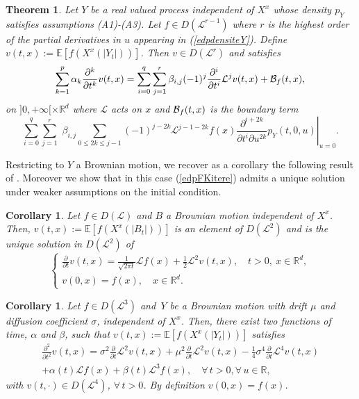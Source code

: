 \documentclass[a4paper, 11pt]{article}
\newtheorem{corol}[prop]{Corollary}
\newtheorem{thm}{Theorem}%
\newcommand{\R}{\mathbb{R}}
\newcommand{\E}{\mathbb{E}}
\newcommand{\1}{\mathbf{1}}
\begin{document}
\begin{thm}
\label{FKitere}
Let $Y$ be a real valued process independent of $X^x$ whose density $p_Y$ satisfies assumptions {\rm (A1)}-{\rm (A3)}. Let $f\in D(\mathcal{L}^{r-1})$ where $r$ is the highest order of the partial derivatives in $u$ appearing in (\ref{edpdensiteY}).  Define $v(t,x):=\E \left[f(X^x(|Y_t|))\right]$. Then $v\in D(\mathcal{L}^{r})$ and satisfies
\begin{equation}
\label{edpFKitere}
\sum_{k=1}^{p} \alpha_k \frac{\partial^k}{\partial t^k}v(t,x)=\sum_{i=0}^{q}\sum_{j=1}^{r}\beta_{i,j}(-1)^j\frac{\partial^i}{\partial t^i}\mathcal{L}^jv(t,x)+{\cal B}_f(t,x),
\end{equation}
on $]0,+\infty[\times \R^d$ where $\mathcal{L}$ acts on $x$ and  ${\cal B}_f(t,x)$ is the boundary term
\begin{equation}
\sum_{i=0}^{q}\sum_{j=1}^{r}\, \, \beta_{i,j}\sum_{0\leq 2k\leq j-1} (-1)^{j-2k}\mathcal{L}^{j-1-2k}f(x)\left. \frac{\partial^{i+2k}}{\partial t^i \partial u^{2k}}p_Y(t,0,u)\right|_{u=0}.
\end{equation}
\end{thm}


\bigskip


\noindent Restricting to $Y$ a Brownian motion, we recover as a corollary the following result of \cite{allouba}. Moreover we show that in this case (\ref{edpFKitere}) admits a unique solution under weaker assumptions on the initial condition.
\begin{corol}\label{corol:2}
Let $f\in D(\mathcal{L})$ and $B$ a Brownian motion independent of $X^x$. Then, $v(t,x):=\E \left[f(X^x(|B_t|))\right]$ is an element of $D(\mathcal{L}^2)$ and is the unique solution in $D(\mathcal{L}^2)$ of
\begin{equation}
\begin{cases} 
\label{FKibm}
\frac{\partial}{\partial t}v(t,x)=\frac{1}{\sqrt{2\pi t}}\mathcal{L}f(x)+\frac{1}{2}\mathcal{L}^2v(t,x), \quad t>0,\ x\in\R^d,\\
v(0,x)=f(x), \quad x\in\R^d.
\end{cases}
\end{equation}

\end{corol}
\begin{corol}
Let $f\in D(\mathcal{L}^3)$ and $\, Y$ be a Brownian motion with drift $\mu$ and diffusion coefficient $\sigma$, independent of $X^x$. Then, there exist two functions of time, $\alpha$ and $\beta$, such that $v(t,x):=\E \left[f(X^x(|Y_t|))\right]$ satisfies
\begin{multline*}
\frac{\partial^2}{\partial t^2}v(t,x)=\sigma^2\frac{\partial}{\partial t}\mathcal{L}^2v(t,x)+\mu^2\frac{\partial}{\partial t}\mathcal{L}^2v(t,x)-\frac{1}{4}\sigma^4\frac{\partial}{\partial t}\mathcal{L}^4v(t,x)\\
+\alpha(t)\mathcal{L}f(x)+\beta(t)\mathcal{L}^3f(x), \quad \forall \, t>0, \forall \, u\in \R,
\end{multline*}
with $v(t,\cdot)\in D(\mathcal{L}^4)$, $\forall\,  t>0$. By definition $v(0,x)=f(x)$. 
\end{corol}
\end{document}
